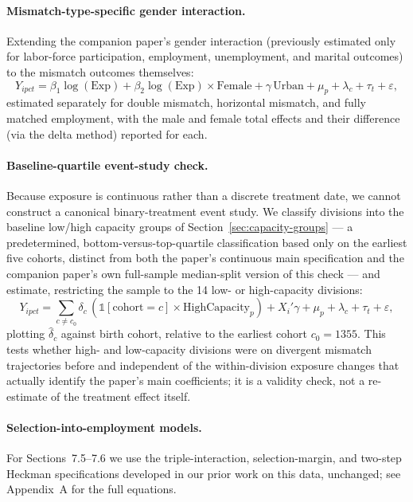 \documentclass[11pt]{article}
\begin{document}
\paragraph{Mismatch-type-specific gender interaction.} Extending the companion paper's gender interaction (previously estimated only for labor-force participation, employment, unemployment, and marital outcomes) to the mismatch outcomes themselves:
\begin{equation}
Y_{ipct} = \beta_1 \log(\text{Exp}) + \beta_2 \log(\text{Exp})\times\text{Female} + \gamma\, \text{Urban} + \mu_p + \lambda_c + \tau_t + \varepsilon,
\end{equation}
estimated separately for double mismatch, horizontal mismatch, and fully matched employment, with the male and female total effects and their difference (via the delta method) reported for each.

\paragraph{Baseline-quartile event-study check.} Because exposure is continuous rather than a discrete treatment date, we cannot construct a canonical binary-treatment event study. We classify divisions into the baseline low/high capacity groups of Section~\ref{sec:capacity-groups} --- a predetermined, bottom-versus-top-quartile classification based only on the earliest five cohorts, distinct from both the paper's continuous main specification and the companion paper's own full-sample median-split version of this check --- and estimate, restricting the sample to the 14 low- or high-capacity divisions:
\begin{equation}
Y_{ipct} = \sum_{c \neq c_0} \delta_c\, (\mathbb{1}[\text{cohort}=c] \times \text{HighCapacity}_p) + X_i'\gamma + \mu_p + \lambda_c + \tau_t + \varepsilon,
\end{equation}
plotting $\hat\delta_c$ against birth cohort, relative to the earliest cohort $c_0=1355$. This tests whether high- and low-capacity divisions were on divergent mismatch trajectories before and independent of the within-division exposure changes that actually identify the paper's main coefficients; it is a validity check, not a re-estimate of the treatment effect itself.

\paragraph{Selection-into-employment models.} For Sections~7.5--7.6 we use the triple-interaction, selection-margin, and two-step Heckman specifications developed in our prior work on this data, unchanged; see Appendix~A for the full equations.
\end{document}

